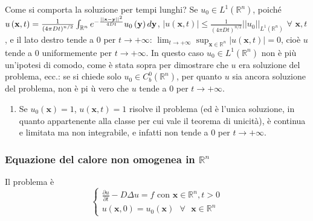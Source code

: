 \documentclass{article}
\begin{document}
Come si comporta la soluzione per tempi lunghi? Se $u_{0}\in L^{1}\left( 
\mathbb{R}
^{n}\right) $, poich\'{e} $u\left( \mathbf{x},t\right) =\frac{1}{\left( 4\pi
Dt\right) ^{n/2}}\int_{%
\mathbb{R}
^{n}}e^{-\frac{\left\vert \left\vert \mathbf{x-y}\right\vert \right\vert ^{2}%
}{4Dt}}u_{0}\left( \mathbf{y}\right) d\mathbf{y}$, $\left\vert u\left( 
\mathbf{x},t\right) \right\vert \leq \frac{1}{\left( 4\pi Dt\right) ^{n/2}}%
\left\vert \left\vert u_{0}\right\vert \right\vert _{L^{1}\left( 
\mathbb{R}
^{n}\right) }$ $\forall $ $\mathbf{x},t$, e il lato destro tende a $0$ per $%
t\rightarrow +\infty $: $\lim_{t\rightarrow +\infty }\sup_{\mathbf{x}\in 
\mathbb{R}
^{n}}\left\vert u\left( \mathbf{x},t\right) \right\vert =0$, cio\`{e} $u$
tende a $0$ uniformemente per $t\rightarrow +\infty $. In questo caso $%
u_{0}\in L^{1}\left( 
\mathbb{R}
^{n}\right) $ non \`{e} pi\`{u} un'ipotesi di comodo, come \`{e} stata sopra
per dimostrare che $u$ era soluzione del problema, ecc.: se si chiede solo $%
u_{0}\in C_{b}^{0}\left( 
\mathbb{R}
^{n}\right) $, per quanto $u$ sia ancora soluzione del problema, non \`{e} pi%
\`{u} vero che $u$ tende a $0$ per $t\rightarrow +\infty $.

\begin{enumerate}
\item Se $u_{0}\left( \mathbf{x}\right) =1$, $u\left( \mathbf{x},t\right) =1$
risolve il problema (ed \`{e} l'unica soluzione, in quanto appartenente alla
classe per cui vale il teorema di unicit\`{a}), \`{e} continua e limitata ma
non integrabile, e infatti non tende a $0$ per $t\rightarrow +\infty $.
\end{enumerate}

\subsubsection{Equazione del calore non omogenea in $%
\mathbb{R}
^{n}$}

Il problema \`{e}%
\begin{equation*}
\left\{ 
\begin{array}{c}
\frac{\partial u}{\partial t}-D\Delta u=f\text{ con }\mathbf{x}\in 
\mathbb{R}
^{n},t>0 \\ 
u\left( \mathbf{x},0\right) =u_{0}\left( \mathbf{x}\right) \text{ }\forall 
\text{ }\mathbf{x}\in 
\mathbb{R}
^{n}%
\end{array}%
\right.
\end{equation*}
\end{document}
